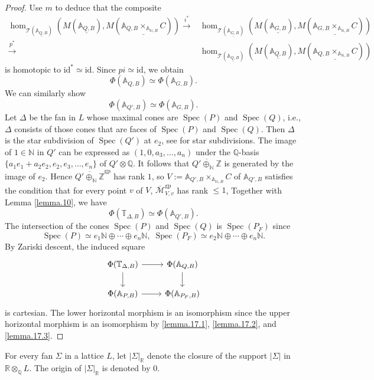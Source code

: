 \documentclass[10pt]{amsart}
\theoremstyle{definition}
\theoremstyle{remark}
\numberwithin{equation}{subsection}
\newcommand{\A}{\mathbb{A}}
\newcommand{\N}{\mathbb{N}}
\newcommand{\Q}{\mathbb{Q}}
\newcommand{\R}{\mathbb{R}}
\newcommand{\T}{\mathbb{T}}
\newcommand{\Z}{\mathbb{Z}}
\newcommand{\cM}{\mathcal{M}}
\newcommand{\sT}{\mathscr{T}}
\DeclareMathOperator{\Spec}{Spec}
\newcommand{\id}{\mathrm{id}}
\newcommand{\ul}{\underline}
\newcommand{\ol}{\overline}
\newcommand{\gp}{\mathrm{gp}}
\begin{document}
\begin{proof}
Use $m$ to deduce that the composite
\begin{align*}
\hom_{\sT(\ul{\A_{Q,B}})}
(M(\ul{\A_{Q,B}}),
M(\ul{\A_{Q,B}\times_{\A_{\N,B}}C}))
\xrightarrow{i^*} &
\hom_{\sT(\ul{\A_{G,B}})}
(M(\ul{\A_{G,B}}),
M(\ul{\A_{G,B}\times_{\A_{\N,B}}C}))
\\
\xrightarrow{p^*} &
\hom_{\sT(\ul{\A_{Q,B}})}
(M(\ul{\A_{Q,B}}),
M(\ul{\A_{Q,B}\times_{\A_{\N,B}}C}))
\end{align*}
is homotopic to $\id^*\simeq \id$.
Since $pi\simeq \id$,
we obtain
\begin{equation}
\label{lemma.17.1}
\Phi(\A_{Q,B})
\simeq
\Phi(\A_{G,B}).
\end{equation}
We can similarly show
\begin{equation}
\label{lemma.17.2}
\Phi(\A_{Q',B})
\simeq
\Phi(\A_{G,B}).
\end{equation}
Let $\Delta$ be the fan in $L$ whose maximal cones are $\Spec(P)$ and $\Spec(Q)$,
i.e., $\Delta$ consists of those cones that are faces of $\Spec(P)$ and $\Spec(Q)$.
Then $\Delta$ is the star subdivision of $\Spec(Q')$ at $e_2$,
see \cite[\S 11.1]{CLStoric} for star subdivisions.
The image of $1\in \N$ in $Q'$ can be expressed as $(1,0,a_3,\ldots,a_n)$ under the $\Q$-basis $\{a_1e_1+a_2e_2,e_2,e_3,\ldots,e_n\}$ of $Q'\otimes \Q$.
It follows that $\ol{Q'\oplus_{\N} \Z}$ is generated by the image of $e_2$.
Hence $\ol{Q'\oplus_{\N}\Z}^\gp$ has rank $1$,
so $V:=\A_{Q',B}\times_{\A_{\N,B}}C$ of $\A_{Q',B}$ satisfies the condition that for every point $v$ of $V$, $\ol{\cM}_{V,v}^\gp$ has rank $\leq 1$,
Together with Lemma \ref{lemma.10},
we have
\begin{equation}
\label{lemma.17.3}
\Phi(\T_{\Delta,B})\simeq \Phi(\A_{Q',B}).
\end{equation}
The intersection of the cones $\Spec(P)$ and $\Spec(Q)$ is $\Spec(P_F)$ since
\[
\Spec(P)
\simeq e_1\N \oplus \cdots \oplus e_n \N,
\;
\Spec(P_F)
\simeq e_2 \N\oplus \cdots \oplus e_n \N.
\]
By Zariski descent, the induced square
\[
\begin{tikzcd}
\Phi(\T_{\Delta,B})\ar[d]\ar[r]&
\Phi(\A_{Q,B})\ar[d]
\\
\Phi(\A_{P,B})\ar[r]&
\Phi(\A_{P_F,B})
\end{tikzcd}
\]
is cartesian.
The lower horizontal morphism is an isomorphism since the upper horizontal morphism is an isomorphism by \eqref{lemma.17.1}, \eqref{lemma.17.2}, and \eqref{lemma.17.3}.
\end{proof}

For every fan $\Sigma$ in a lattice $L$, let $|\Sigma|_{\R}$ denote the closure of the support $|\Sigma|$ in $\R\otimes_{\Q} L$.
The origin of $|\Sigma|_{\R}$ is denoted by $0$.
\end{document}
